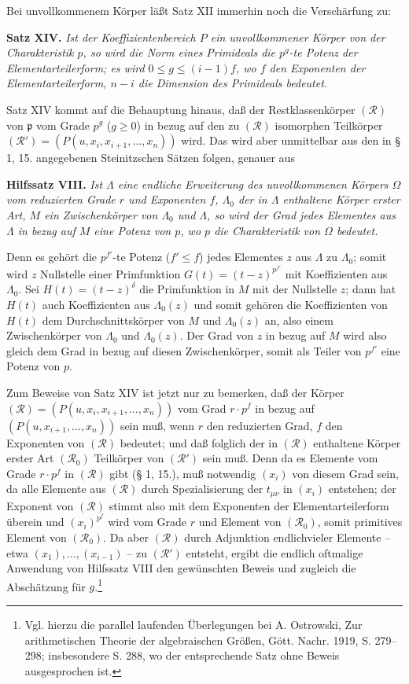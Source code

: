 \documentclass[11pt]{article}
\providecommand{\frakp}{\mathfrak p}
\begin{document}
Bei unvollkommenem Körper läßt Satz XII immerhin noch die Verschärfung zu:

\textbf{Satz XIV.} \emph{Ist der Koeffizientenbereich $P$ ein unvollkommener Körper von der Charakteristik $p$, so wird die Norm eines Primideals die $p^g$-te Potenz der Elementarteilerform; es wird $0\le g\le(i-1)f$, wo $f$ den Exponenten der Elementarteilerform, $n-i$ die Dimension des Primideals bedeutet.}

Satz XIV kommt auf die Behauptung hinaus, daß der Restklassenkörper $(\mathcal R)$ von $\frakp$ vom Grade $p^g$ ($g\ge0$) in bezug auf den zu $(\mathcal R)$ isomorphen Teilkörper $(\mathcal R')=(P(u,x_i,x_{i+1},\ldots,x_n))$ wird. Das wird aber unmittelbar aus den in § 1, 15. angegebenen Steinitzschen Sätzen folgen, genauer aus

\textbf{Hilfssatz VIII.} \emph{Ist $\Lambda$ eine endliche Erweiterung des unvollkommenen Körpers $\Omega$ vom reduzierten Grade $r$ und Exponenten $f$, $\Lambda_0$ der in $\Lambda$ enthaltene Körper erster Art, $M$ ein Zwischenkörper von $\Lambda_0$ und $\Lambda$, so wird der Grad jedes Elementes aus $\Lambda$ in bezug auf $M$ eine Potenz von $p$, wo $p$ die Charakteristik von $\Omega$ bedeutet.}

Denn es gehört die $p^{f'}$-te Potenz ($f'\le f$) jedes Elementes $z$ aus $\Lambda$ zu $\Lambda_0$; somit wird $z$ Nullstelle einer Primfunktion $G(t)=(t-z)^{p^{f'}}$ mit Koeffizienten aus $\Lambda_0$. Sei $H(t)=(t-z)^\delta$ die Primfunktion in $M$ mit der Nullstelle $z$; dann hat $H(t)$ auch Koeffizienten aus $\Lambda_0(z)$ und somit gehören die Koeffizienten von $H(t)$ dem Durchschnittskörper von $M$ und $\Lambda_0(z)$ an, also einem Zwischenkörper von $\Lambda_0$ und $\Lambda_0(z)$. Der Grad von $z$ in bezug auf $M$ wird also gleich dem Grad in bezug auf diesen Zwischenkörper, somit als Teiler von $p^{f'}$ eine Potenz von $p$.

Zum Beweise von Satz XIV ist jetzt nur zu bemerken, daß der Körper $(\mathcal R)=(P(u,x_i,x_{i+1},\ldots,x_n))$ vom Grad $r\cdot p^f$ in bezug auf $(P(u,x_{i+1},\ldots,x_n))$ sein muß, wenn $r$ den reduzierten Grad, $f$ den Exponenten von $(\mathcal R)$ bedeutet; und daß folglich der in $(\mathcal R)$ enthaltene Körper erster Art $(\mathcal R_0)$ Teilkörper von $(\mathcal R')$ sein muß. Denn da es Elemente vom Grade $r\cdot p^f$ in $(\mathcal R)$ gibt (§ 1, 15.), muß notwendig $(x_i)$ von diesem Grad sein, da alle Elemente aus $(\mathcal R)$ durch Spezialisierung der $t_{\mu\nu}$ in $(x_i)$ entstehen; der Exponent von $(\mathcal R)$ stimmt also mit dem Exponenten der Elementarteilerform überein und $(x_i)^{p^f}$ wird vom Grade $r$ und Element von $(\mathcal R_0)$, somit primitives Element von $(\mathcal R_0)$. Da aber $(\mathcal R)$ durch Adjunktion endlichvieler Elemente -- etwa $(x_1),\ldots,(x_{i-1})$ -- zu $(\mathcal R')$ entsteht, ergibt die endlich oftmalige Anwendung von Hilfssatz VIII den gewünschten Beweis und zugleich die Abschätzung für $g$.\footnote{Vgl. hierzu die parallel laufenden Überlegungen bei A. Ostrowski, Zur arithmetischen Theorie der algebraischen Größen, Gött. Nachr. 1919, S. 279--298; insbesondere S. 288, wo der entsprechende Satz ohne Beweis ausgesprochen ist.}
\end{document}
